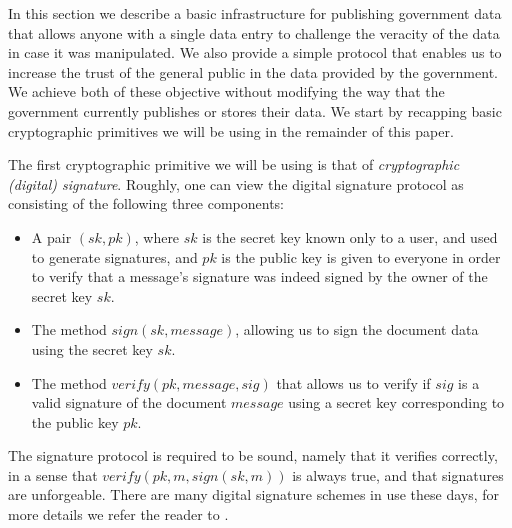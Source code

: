 In this section we describe a basic infrastructure for publishing government data that allows anyone with a single data entry to challenge the veracity of the data in case it was manipulated. We also provide a simple protocol that enables us to increase the trust of the general public in the data provided by the government. We achieve both of these objective without modifying the way that the government currently publishes or stores their data. We start by recapping basic cryptographic primitives we will be using in the remainder of this paper.

\medskip
{} The first cryptographic primitive we will be using is that of {\em cryptographic (digital) signature}. Roughly, one can view the digital signature protocol as consisting of the following three components:
\begin{itemize}
\item A pair $(sk,pk)$, where $sk$ is the secret key known only to a user, and used to generate signatures, and $pk$ is the public key is given to everyone in order to verify that a message's signature was indeed signed by the owner of the secret key $sk$.
\item The method $sign(sk,message)$, allowing us to sign the document data using the secret key $sk$.
\item The method $verify(pk,message,sig)$ that allows us to verify if $sig$ is a valid signature of the document $message$ using a secret key corresponding to the public key $pk$.
\end{itemize}
The signature protocol is required to be sound, namely that it verifies correctly, in a sense that $verify(pk,m,sign(sk,m))$ is always true, and that signatures are unforgeable. There are many digital signature schemes in use these days, for more details we refer the reader to \cite{KatzLindell2014}.

